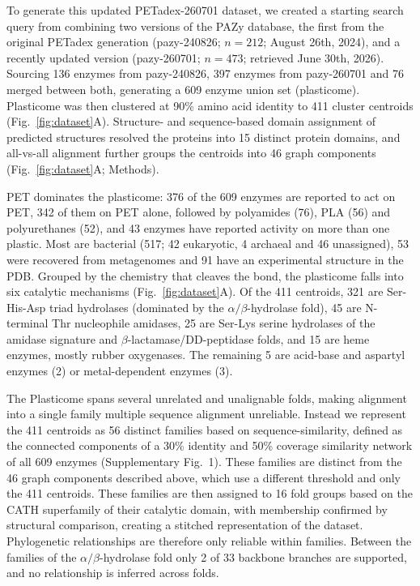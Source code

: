 \documentclass[pdflatex,sn-nature,iicol]{sn-jnl}%
\begin{document}
To generate this updated PETadex-260701 dataset, we created a starting search query from combining two versions of the PAZy database, the first from the original PETadex generation (pazy-240826; $n=212$; August 26th, 2024), and a recently updated version (pazy-260701; $n=473$; retrieved June 30th, 2026). Sourcing 136 enzymes from pazy-240826, 397 enzymes from pazy-260701 and 76 merged between both, generating a 609 enzyme union set (plasticome). Plasticome was then clustered at 90\% amino acid identity to 411 cluster centroids (Fig.~\ref{fig:dataset}A). Structure- and sequence-based domain assignment of predicted structures resolved the proteins into 15 distinct protein domains, and all-vs-all alignment further groups the centroids into 46 graph components (Fig.~\ref{fig:dataset}A; Methods).

PET dominates the plasticome: 376 of the 609 enzymes are reported to act on PET, 342 of them on PET alone, followed by polyamides (76), PLA (56) and polyurethanes (52), and 43 enzymes have reported activity on more than one plastic. Most are bacterial (517; 42 eukaryotic, 4 archaeal and 46 unassigned), 53 were recovered from metagenomes and 91 have an experimental structure in the PDB. Grouped by the chemistry that cleaves the bond, the plasticome falls into six catalytic mechanisms (Fig.~\ref{fig:dataset}A). Of the 411 centroids, 321 are Ser-His-Asp triad hydrolases (dominated by the $\alpha/\beta$-hydrolase fold), 45 are N-terminal Thr nucleophile amidases, 25 are Ser-Lys serine hydrolases of the amidase signature and $\beta$-lactamase/DD-peptidase folds, and 15 are heme enzymes, mostly rubber oxygenases. The remaining 5 are acid-base and aspartyl enzymes (2) or metal-dependent enzymes (3).

The Plasticome spans several unrelated and unalignable folds, making alignment into a single family multiple sequence alignment unreliable. Instead we represent the 411 centroids as 56 distinct families based on sequence-similarity, defined as the connected components of a 30\% identity and 50\% coverage similarity network of all 609 enzymes (Supplementary Fig.~1). These families are distinct from the 46 graph components described above, which use a different threshold and only the 411 centroids. These families are then assigned to 16 fold groups based on the CATH superfamily of their catalytic domain, with membership confirmed by structural comparison, creating a stitched representation of the dataset. Phylogenetic relationships are therefore only reliable within families. Between the families of the $\alpha/\beta$-hydrolase fold only 2 of 33 backbone branches are supported, and no relationship is inferred across folds.
\end{document}
